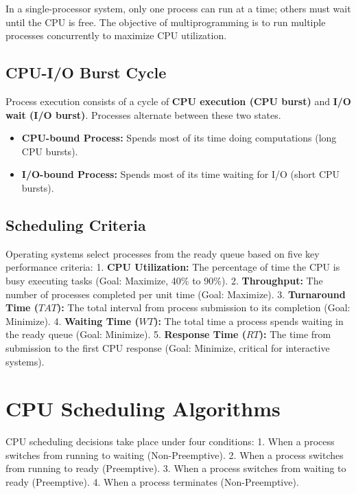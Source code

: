 \documentclass[12pt,a4paper]{article}
\begin{document}
In a single-processor system, only one process can run at a time; others must wait until the CPU is free. The objective of multiprogramming is to run multiple processes concurrently to maximize CPU utilization.

\subsection{CPU-I/O Burst Cycle}
Process execution consists of a cycle of \textbf{CPU execution (CPU burst)} and \textbf{I/O wait (I/O burst)}. Processes alternate between these two states.
\begin{itemize}[leftmargin=*, itemsep=3pt]
  \item \textbf{CPU-bound Process:} Spends most of its time doing computations (long CPU bursts).
  \item \textbf{I/O-bound Process:} Spends most of its time waiting for I/O (short CPU bursts).
\end{itemize}

\subsection{Scheduling Criteria}
Operating systems select processes from the ready queue based on five key performance criteria:
1. \textbf{CPU Utilization:} The percentage of time the CPU is busy executing tasks (Goal: Maximize, 40\% to 90\%).
2. \textbf{Throughput:} The number of processes completed per unit time (Goal: Maximize).
3. \textbf{Turnaround Time ($TAT$):} The total interval from process submission to its completion (Goal: Minimize).
4. \textbf{Waiting Time ($WT$):} The total time a process spends waiting in the ready queue (Goal: Minimize).
5. \textbf{Response Time ($RT$):} The time from submission to the first CPU response (Goal: Minimize, critical for interactive systems).

\section{CPU Scheduling Algorithms}

CPU scheduling decisions take place under four conditions:
1. When a process switches from running to waiting (Non-Preemptive).
2. When a process switches from running to ready (Preemptive).
3. When a process switches from waiting to ready (Preemptive).
4. When a process terminates (Non-Preemptive).
\end{document}

